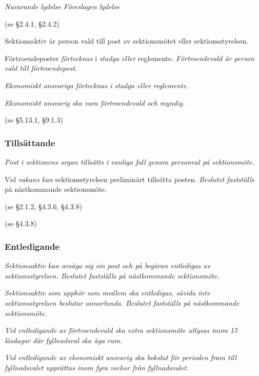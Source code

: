 \documentclass{article}
\newenvironment{lydelse}
    {\begin{paracol}{2}%
        \emph{Nuvarande lydelse}%
        \switchcolumn%
        \emph{Föreslagen lydelse}%
    \end{paracol}%
    \begin{enumerate}[label=\thesubsection.\arabic*]%
    \begin{paracol}{2}%
    }{\end{paracol}\end{enumerate}}
\begin{document}
\begin{lydelse}
    (se \S 2.4.1, \S 2.4.2)
  
  \switchcolumn
    \item Sektionsaktiv är person vald till post av sektionsmötet eller sektionsstyrelsen.
      \label{4.x:aktiv}
  
    \item Förtroendeposter \emph{förtecknas} i \emph{stadga eller} reglemente.
    \emph{Förtroendevald är person vald till förtroendepost.}
      \label{4.x:fortroende}

    \item \emph{Ekonomiskt ansvariga förtecknas i stadga eller reglemente.}

    \item \emph{Ekonomiskt ansvarig ska vara förtroendevald och myndig.}

  \switchcolumn*
    (se \S 5.13.1, \S 9.1.3)
  \switchcolumn
    \subsubsection*{Tillsättande}
    \item \emph{Post i sektionens organ tillsätts i vanliga fall genom personval på sektionsmöte.} \label{4.x:tillsätt}

    \item Vid \emph{vakans kan} sektionsstyrelsen preliminärt tillsätta posten.
    \emph{Beslutet fastställs} på nästkommande sektionsmöte.

  \switchcolumn*
    \item[] (se \S 2.1.2, \S 4.3.6, \S 4.3.8)
    \item[] (se \S 4.3.8)
  
  \switchcolumn
    \subsubsection*{Entledigande}
    \item \emph{Sektionsaktiv kan avsäga sig sin post och på begäran entledigas av sektionsstyrelsen.
    Beslutet fastställs på nästkommande sektionsmöte.}

    \item \emph{Sektionsaktiv som upphör som medlem ska entledigas, såvida inte sektionsstyrelsen beslutar annorlunda.
    Beslutet fastställs på nästkommande sektionsmöte.}
      \label{4.x:kvarstå}

    \item \emph{Vid entledigande av förtroendevald ska extra sektionsmöte utlysas inom 15 läsdagar där fyllnadsval ska äga rum}.

    \item \emph{Vid entledigande av ekonomiskt ansvarig ska bokslut för perioden fram till fyllnadsvalet upprättas inom fyra veckor från fyllnadsvalet.}
      \label{4.2:enteko}
    
\end{lydelse}
\end{document}
